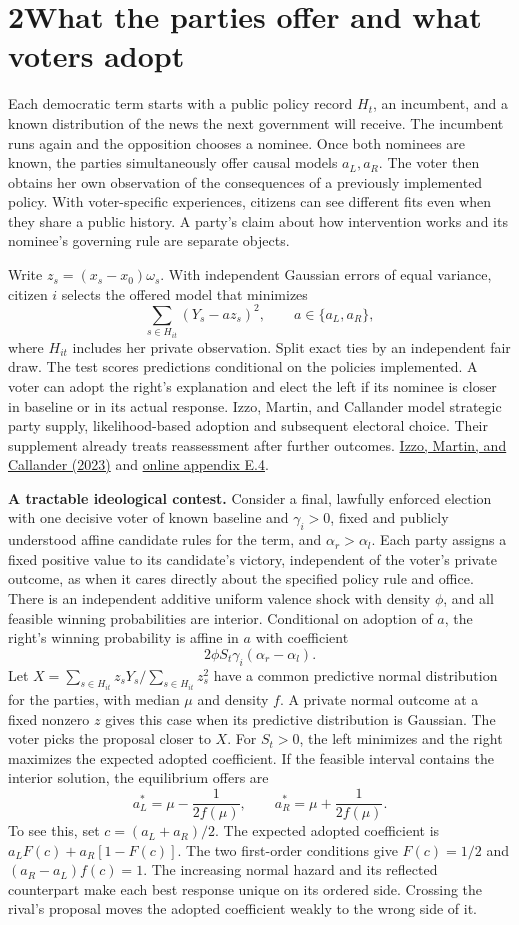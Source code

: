 \documentclass[11pt,letterpaper]{article}
\newcommand{\sect}[1]{\section*{\color{ink}#1}}
\newcommand{\lead}[1]{\textbf{#1}\enspace}
\newcommand{\src}[2]{\href{#1}{#2}}
\begin{document}
\newpage
\sect{2\quad What the parties offer and what voters adopt}
Each democratic term starts with a public policy record $H_t$, an incumbent, and a known distribution of the news the next government will receive. The incumbent runs again and the opposition chooses a nominee. Once both nominees are known, the parties simultaneously offer causal models $a_L,a_R$. The voter then obtains her own observation of the consequences of a previously implemented policy. With voter-specific experiences, citizens can see different fits even when they share a public history. A party's claim about how intervention works and its nominee's governing rule are separate objects.

Write $z_s=(x_s-x_0)\omega_s$. With independent Gaussian errors of equal variance, citizen $i$ selects the offered model that minimizes
\[
 \sum_{s\in H_{it}}(Y_s-a z_s)^2,\qquad a\in\{a_L,a_R\},
\]
where $H_{it}$ includes her private observation. Split exact ties by an independent fair draw. The test scores predictions conditional on the policies implemented. A voter can adopt the right's explanation and elect the left if its nominee is closer in baseline or in its actual response. Izzo, Martin, and Callander model strategic party supply, likelihood-based adoption and subsequent electoral choice. Their supplement already treats reassessment after further outcomes. \src{https://doi.org/10.1111/ajps.12763}{Izzo, Martin, and Callander (2023)} and \src{https://www.federicaizzo.com/pdf/Ideological_Competition_FINAL_Website.pdf}{online appendix E.4}.

\lead{A tractable ideological contest.} Consider a final, lawfully enforced election with one decisive voter of known baseline and $\gamma_i>0$, fixed and publicly understood affine candidate rules for the term, and $\alpha_r>\alpha_l$. Each party assigns a fixed positive value to its candidate's victory, independent of the voter's private outcome, as when it cares directly about the specified policy rule and office. There is an independent additive uniform valence shock with density $\phi$, and all feasible winning probabilities are interior. Conditional on adoption of $a$, the right's winning probability is affine in $a$ with coefficient
\[
 2\phi S_t\gamma_i(\alpha_r-\alpha_l).
\]
Let $X=\sum_{s\in H_{it}}z_sY_s/\sum_{s\in H_{it}}z_s^2$ have a common predictive normal distribution for the parties, with median $\mu$ and density $f$. A private normal outcome at a fixed nonzero $z$ gives this case when its predictive distribution is Gaussian. The voter picks the proposal closer to $X$. For $S_t>0$, the left minimizes and the right maximizes the expected adopted coefficient. If the feasible interval contains the interior solution, the equilibrium offers are
\[
 a_L^*=\mu-\frac{1}{2f(\mu)},\qquad a_R^*=\mu+\frac{1}{2f(\mu)}.
\]
To see this, set $c=(a_L+a_R)/2$. The expected adopted coefficient is $a_L F(c)+a_R[1-F(c)]$. The two first-order conditions give $F(c)=1/2$ and $(a_R-a_L)f(c)=1$. The increasing normal hazard and its reflected counterpart make each best response unique on its ordered side. Crossing the rival's proposal moves the adopted coefficient weakly to the wrong side of it.
\end{document}
